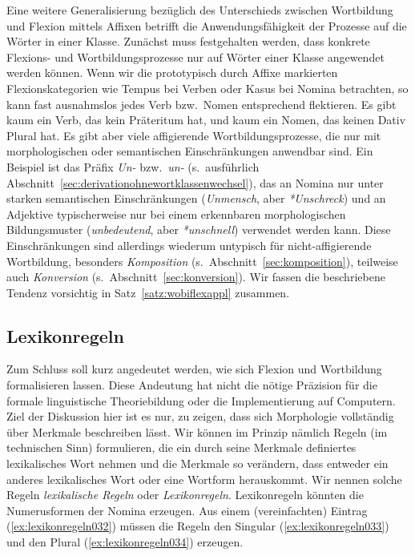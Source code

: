 Eine weitere Generalisierung bezüglich des Unterschieds zwischen Wortbildung und Flexion mittels Affixen betrifft die Anwendungsfähigkeit der Prozesse auf die Wörter in einer Klasse.
Zunächst muss festgehalten werden, dass konkrete Flexions- und Wortbildungsprozesse nur auf Wörter einer Klasse angewendet werden können.
Wenn wir die prototypisch durch Affixe markierten Flexionskategorien wie Tempus bei Verben oder Kasus bei Nomina betrachten, so kann fast ausnahmslos jedes Verb bzw.\ Nomen entsprechend flektieren.
Es gibt \zB kaum ein Verb, das kein Präteritum hat, und kaum ein Nomen, das keinen Dativ Plural hat.
Es gibt aber viele affigierende Wortbildungsprozesse, die nur mit morphologischen oder semantischen Einschränkungen anwendbar sind.
Ein Beispiel ist das Präfix \textit{Un-} bzw.\ \textit{un-} (s.\ ausführlich Abschnitt~\ref{sec:derivationohnewortklassenwechsel}), das an Nomina nur unter starken semantischen Einschränkungen (\textit{Unmensch}, aber \textit{*Unschreck}) und an Adjektive typischerweise nur bei einem erkennbaren morphologischen Bildungsmuster (\textit{unbedeutend}, aber \textit{*unschnell}) verwendet werden kann.
Diese Einschränkungen sind allerdings wiederum untypisch für nicht-affigierende Wortbildung, besonders \textit{Komposition} (s.\ Abschnitt~\ref{sec:komposition}), teilweise auch \textit{Konversion} (s.\ Abschnitt~\ref{sec:konversion}).
Wir fassen die beschriebene Tendenz vorsichtig in Satz~\ref{satz:wobiflexappl} zusammen.


\subsection{Lexikonregeln}
\label{sec:lexikonregeln}


Zum Schluss soll kurz angedeutet werden, wie sich Flexion und Wortbildung formalisieren lassen.
Diese Andeutung hat nicht die nötige Präzision für die formale linguistische Theoriebildung oder die Implementierung auf Computern.
Ziel der Diskussion hier ist es nur, zu zeigen, dass sich Morphologie vollständig über Merkmale beschreiben lässt.
Wir können im Prinzip nämlich Regeln (im technischen Sinn) formulieren, die ein durch seine Merkmale definiertes lexikalisches Wort nehmen und die Merkmale so verändern, dass entweder ein anderes lexikalisches Wort oder eine Wortform herauskommt.
Wir nennen solche Regeln \textit{lexikalische Regeln} oder \textit{Lexikonregeln}.
Lexikonregeln könnten \zB die Numerusformen der Nomina erzeugen.
Aus einem (vereinfachten) Eintrag (\ref{ex:lexikonregeln032}) müssen die Regeln den Singular (\ref{ex:lexikonregeln033}) und den Plural (\ref{ex:lexikonregeln034}) erzeugen.


